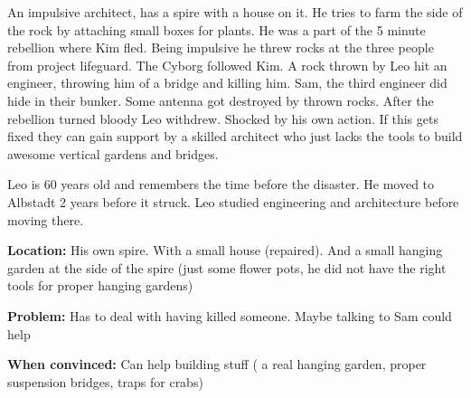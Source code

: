 \begin{npcBox}[title=Leo]
    \begin{consequences}
    \item {}
    \item {}
    \item {}
    \end{consequences}

    \begin{npcDescription}
    An impulsive architect, has a spire with a house on it. He tries to farm the side of the rock by attaching small boxes for plants.
    He was a part of the 5 minute rebellion where Kim fled. Being impulsive he threw rocks at the three people from project lifeguard. The Cyborg followed Kim. A rock thrown by Leo hit an engineer, throwing him of a bridge and killing him. Sam, the third engineer did hide in their bunker. Some antenna got destroyed by thrown rocks.
    After the rebellion turned bloody Leo withdrew. Shocked by his own action.
    If this gets fixed they can gain support by a skilled architect who just lacks the tools to build awesome vertical gardens and bridges.

    Leo is 60 years old and remembers the time before the disaster. He moved to Albstadt 2 years before it struck. Leo studied engineering and architecture before moving there.

    \textbf{Location:} His own spire. With a small house (repaired). And a small hanging garden at the side of the spire (just some flower pots, he did not have the right tools for proper hanging gardens)

    \textbf{Problem:} Has to deal with having killed someone. Maybe talking to Sam could help

    \textbf{When convinced:} Can help building stuff ( a real hanging garden, proper suspension bridges, traps for crabs)
    \end{npcDescription}

\end{npcBox}

\newpage

